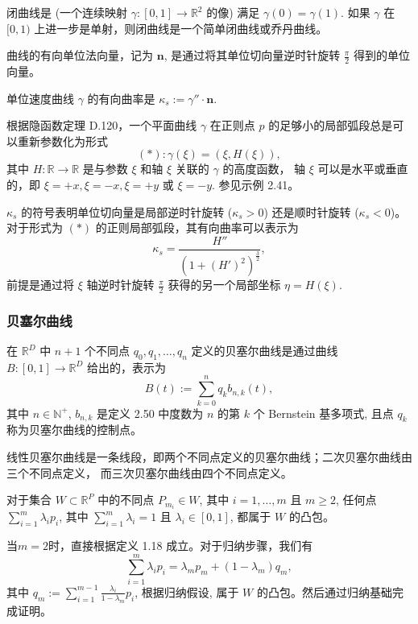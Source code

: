 \documentclass[a4paper]{ctexart}
\begin{document}
{ 闭曲线是 (一个连续映射 $\gamma : [0, 1] \rightarrow \mathbb{R}^2$ 的像) 满足 $\gamma(0) = \gamma(1)$. 
如果 $\gamma$ 在$[0, 1)$ 上进一步是单射，则闭曲线是一个简单闭曲线或乔丹曲线。

 曲线的有向单位法向量，记为 $\mathbf{n}$, 是通过将其单位切向量逆时针旋转 $\frac{\pi}{2}$ 得到的单位向量。

 单位速度曲线 $\gamma$ 的有向曲率是 $\kappa_s := \gamma'' \cdot \mathbf{n}$.

 根据隐函数定理 D.120，一个平面曲线 $\gamma$ 在正则点 $p$ 的足够小的局部弧段总是可以重新参数化为形式
$$
(*) : \gamma(\xi) = (\xi, H(\xi)),
$$
其中 $H : \mathbb{R} \rightarrow \mathbb{R}$ 是与参数 $\xi$ 和轴 $\xi$ 关联的 $\gamma$ 的高度函数，
轴 $\xi$ 可以是水平或垂直的，即 $\xi = +x, \xi = -x, \xi = +y$ 或 $\xi = -y$. 参见示例 2.41。

$\kappa_s$ 的符号表明单位切向量是局部逆时针旋转 ($\kappa_s > 0$) 还是顺时针旋转 ($\kappa_s < 0$)。对于形式为 $(*)$ 的正则局部弧段，其有向曲率可以表示为
$$
\kappa_s = \frac{H''}{(1 + (H')^2)^{\frac{3}{2}}},
$$
前提是通过将 $\xi$ 轴逆时针旋转 $\frac{\pi}{2}$ 获得的另一个局部坐标 $\eta = H(\xi)$.

\subsubsection{贝塞尔曲线}

 在 $\mathbb{R}^D$ 中 $n + 1$ 个不同点 $q_0, q_1, \ldots, q_n$ 定义的贝塞尔曲线是通过曲线 
$B : [0, 1] \rightarrow \mathbb{R}^D$ 给出的，表示为
$$
B(t) := \sum_{k=0}^{n} q_k b_{n,k}(t),
$$
其中 $n \in \mathbb{N}^+$, $b_{n,k}$ 是定义 2.50 中度数为 $n$ 的第 $k$ 个 Bernstein 基多项式, 且点 $q_k$ 称为贝塞尔曲线的控制点。

 线性贝塞尔曲线是一条线段，即两个不同点定义的贝塞尔曲线；二次贝塞尔曲线由三个不同点定义，
而三次贝塞尔曲线由四个不同点定义。

 对于集合 $W \subset \mathbb{R}^P$ 中的不同点 $P_{m_i} \in W$, 
其中 $i = 1, \ldots, m$ 且 $m \geq 2$, 任何点 $\sum_{i=1}^{m} \lambda_i p_i$, 其中 $\sum_{i=1}^{m} \lambda_i = 1$ 且 $\lambda_i \in [0, 1]$, 
都属于 $W$ 的凸包。

当$m = 2$时，直接根据定义 1.18 成立。对于归纳步骤，我们有
$$
\sum_{i = 1}^{m} \lambda_i p_i = \lambda_m p_m + (1 - \lambda_m) q_m,
$$
其中 $q_m := \sum_{i=1}^{m-1} \frac{\lambda_i}{1-\lambda_m} p_i$, 根据归纳假设, 属于 $W$ 的凸包。然后通过归纳基础完成证明。

}
\end{document}
